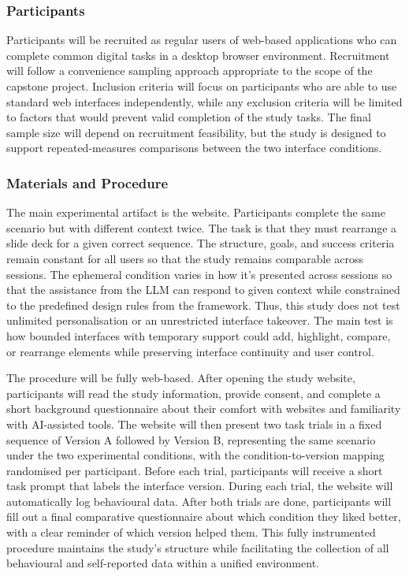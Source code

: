 \subsubsection{Participants}
Participants will be recruited as regular users of web-based applications who can complete common digital tasks in a desktop browser environment. Recruitment will follow a convenience sampling approach appropriate to the scope of the capstone project. Inclusion criteria will focus on participants who are able to use standard web interfaces independently, while any exclusion criteria will be limited to factors that would prevent valid completion of the study tasks. The final sample size will depend on recruitment feasibility, but the study is designed to support repeated-measures comparisons between the two interface conditions.

\subsubsection{Materials and Procedure}
The main experimental artifact is the website. Participants complete the same scenario but with different context twice. The task is that they must rearrange a slide deck for a given correct sequence. The structure, goals, and success criteria remain constant for all users so that the study remains comparable across sessions. The ephemeral condition varies in how it's presented across sessions so that the assistance from the LLM can respond to given context while constrained to the predefined design rules from the framework. Thus, this study does not test unlimited personalisation or an unrestricted interface takeover. The main test is how bounded interfaces with temporary support could add, highlight, compare, or rearrange elements while preserving interface continuity and user control.

The procedure will be fully web-based. After opening the study website, participants will read the study information, provide consent, and complete a short background questionnaire about their comfort with websites and familiarity with AI-assisted tools. The website will then present two task trials in a fixed sequence of Version A followed by Version B, representing the same scenario under the two experimental conditions, with the condition-to-version mapping randomised per participant. Before each trial, participants will receive a short task prompt that labels the interface version. During each trial, the website will automatically log behavioural data. After both trials are done, participants will fill out a final comparative questionnaire about which condition they liked better, with a clear reminder of which version helped them. This fully instrumented procedure maintains the study's structure while facilitating the collection of all behavioural and self-reported data within a unified environment.


